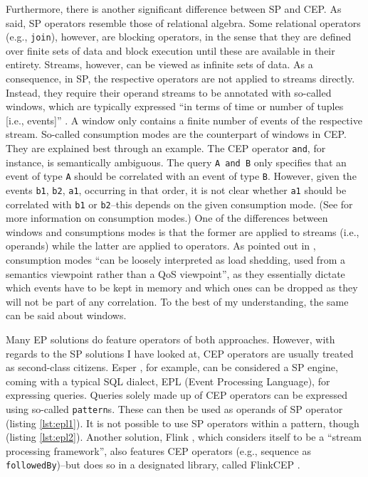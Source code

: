 \documentclass[article, type=bsc, colorback, accentcolor=tud8b, parskip=half, bibliography=totocnumbered]{tudthesis}
\begin{document}
Furthermore, there is another significant difference between SP and CEP.
As said, SP operators resemble those of relational algebra.
Some relational operators (e.g., \lstinline{join}), however, are blocking operators, in the sense that they are defined over finite sets of data and block execution until these are available in their entirety.
Streams, however, can be viewed as infinite sets of data.
As a consequence, in SP, the respective operators are not applied to streams directly.
Instead, they require their operand streams to be annotated with so-called windows, which are typically expressed ``in terms of time or number of tuples [i.e., events]'' \cite{Chakravarthy:2009:SDP:1550717}.
A window only contains a finite number of events of the respective stream.
So-called consumption modes are the counterpart of windows in CEP.
They are explained best through an example.
The CEP operator \lstinline{and}, for instance, is semantically ambiguous.
The query \lstinline{A and B} only specifies that an event of type \lstinline{A} should be correlated with an event of type \lstinline{B}.
However, given the events \lstinline{b1}, \lstinline{b2}, \lstinline{a1}, occurring in that order, it is not clear whether \lstinline{a1} should be correlated with \lstinline{b1} or \lstinline{b2}--this depends on the given consumption mode.
(See \cite{Chakravarthy:1994:CEA:645920.672994} for more information on consumption modes.)
One of the differences between windows and consumptions modes is that the former are applied to streams (i.e., operands) while the latter are applied to operators.
As pointed out in \cite{Chakravarthy:2009:SDP:1550717}, consumption modes ``can be loosely interpreted as load shedding, used from a semantics viewpoint rather than a QoS viewpoint'', as they essentially dictate which events have to be kept in memory and which ones can be dropped as they will not be part of any correlation.
To the best of my understanding, the same can be said about windows.

Many EP solutions do feature operators of both approaches.
However, with regards to the SP solutions I have looked at, CEP operators are usually treated as second-class citizens.
Esper \cite{esper}, for example, can be considered a SP engine, coming with a typical SQL dialect, EPL (Event Processing Language), for expressing queries.
Queries solely made up of CEP operators can be expressed using so-called \lstinline{pattern}s.
These can then be used as operands of SP operator (listing \ref{lst:epl1}).
It is not possible to use SP operators within a pattern, though (listing \ref{lst:epl2}).
Another solution, Flink \cite{flink}, which considers itself to be a ``stream processing framework'', also features CEP operators (e.g., sequence as \lstinline{followedBy})--but does so in a designated library, called FlinkCEP \cite{flinkcep}.
\end{document}
